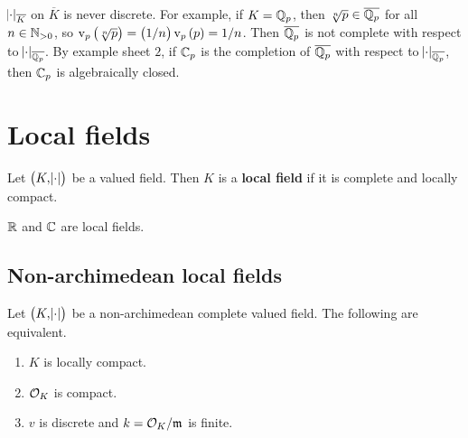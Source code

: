 \begin{remark*}
$ \abs{\cdot}_{\overline{K}} $ on $ \overline{K} $ is never discrete. For example, if $ K = \mathbb{Q}_p $, then $ \sqrt[n]{p} \in \overline{\mathbb{Q}_p} $ for all $ n \in \mathbb{N}_{> 0} $, so $ \v_p\br{\sqrt[n]{p}} = \br{1 / n}\v_p\br{p} = 1 / n $. Then $ \overline{\mathbb{Q}_p} $ is not complete with respect to $ \abs{\cdot}_{\overline{\mathbb{Q}_p}} $. By example sheet $ 2 $, if $ \mathbb{C}_p $ is the completion of $ \overline{\mathbb{Q}_p} $ with respect to $ \abs{\cdot}_{\overline{\mathbb{Q}_p}} $, then $ \mathbb{C}_p $ is algebraically closed.
\end{remark*}

\pagebreak

\section{Local fields}

\begin{definition}
Let $ \br{K, \abs{\cdot}} $ be a valued field. Then $ K $ is a \textbf{local field} if it is complete and locally compact.
\end{definition}

\begin{example*}
$ \mathbb{R} $ and $ \mathbb{C} $ are local fields.
\end{example*}

\subsection{Non-archimedean local fields}

\begin{proposition}
Let $ \br{K, \abs{\cdot}} $ be a non-archimedean complete valued field. The following are equivalent.
\begin{enumerate}
\item $ K $ is locally compact.
\item $ \mathcal{O}_K $ is compact.
\item $ v $ is discrete and $ k = \mathcal{O}_K / \mathfrak{m} $ is finite.
\end{enumerate}
\end{proposition}

